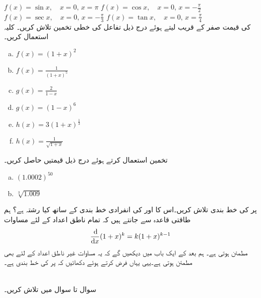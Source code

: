 $f(x)=\sin x,\quad x=0,\, x=\pi$
$f(x)=\cos x,\quad x=0,\, x=-\tfrac{\pi}{2}$
$f(x)=\sec x,\quad x=0,\, x=-\tfrac{\pi}{3}$
$f(x)=\tan x,\quad x=0,\, x=\tfrac{\pi}{4}$
\\
 کی قیمت صفر کے قریب لیتے ہوئے درج ذیل تفاعل کی خطی تخمین تلاش کریں۔ کلیہ  استعمال کریں۔
\begin{multicols}{3}
\begin{enumerate}[a.]
\item
$f(x)=(1+x)^2$
\item
$f(x)=\frac{1}{(1+x)^5}$
\item
$g(x)=\frac{2}{1-x}$
\item
$g(x)=(1-x)^6$
\item
$h(x)=3(1+x)^{\tfrac{1}{3}}$
\item
$h(x)=\frac{1}{\sqrt{1+x}}$
\end{enumerate}
\end{multicols}
\quad
تخمین  استعمال کرتے ہوئے درج ذیل قیمتیں حاصل کریں۔
\begin{multicols}{2}
\begin{enumerate}[a.]
\item
$(1.0002)^{50}$
\item
$\sqrt[3]{1.009}$
\end{enumerate}
\end{multicols}
 پر  کی خط بندی تلاش کریں۔اس کا  اور  کی انفرادی خط بندی کے ساتھ کیا رشتہ ہے؟
ہم طاقتی قاعدہ سے جانتے ہیں کہ تمام ناطق اعداد  کے لئے مساوات
\begin{align*}
\frac{\dif}{\dif x}(1+x)^k=k(1+x)^{k-1}
\end{align*}
مطمئن ہوتی ہے۔ ہم بعد کے ایک باب میں دیکھیں گے کہ یہ مساوات غیر ناطق اعداد کے لئے بھی مطمئن ہوتی ہے۔یہی یہاں فرض کرتے ہوئے دکھائیں کہ  پر  کی خط بندی  ہے۔

\\
سوال  تا سوال  میں  تلاش کریں۔

